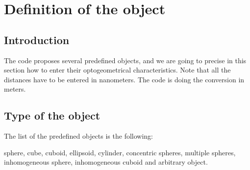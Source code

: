 \chapter{Definition of the object}\label{chap4}

\minitoc

\section{Introduction}

The code proposes several predefined objects, and we are going to
precise in this section how to enter their optogeometrical
characteristics.  Note that all the distances have to be entered in
nanometers. The code is doing the conversion in meters.


\section{Type of the object}


The list of the predefined objects is the following: 

sphere, cube, cuboid, ellipsoid, cylinder, concentric spheres,
multiple spheres, inhomogeneous sphere, inhomogeneous cuboid and
arbitrary object.


